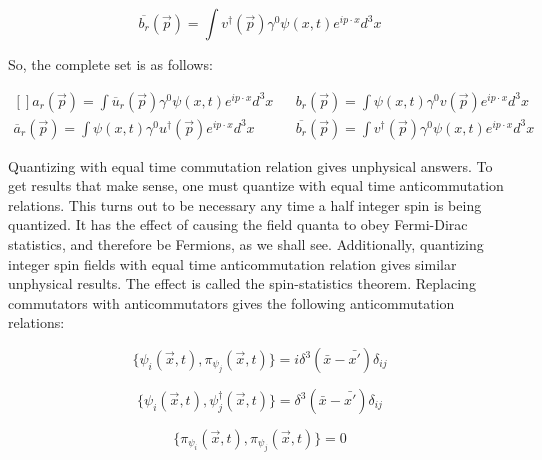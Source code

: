 \documentclass[a4]{article}
\begin{document}
    \begin{framed}
        \begin{equation}
            \overline{b_r} (\vec{p}) = \int v^{\dagger} (\vec{p}) \gamma^0 \psi (x, t) e^{i p \cdot x} d^3 x
        \end{equation}
    \end{framed}

    So, the complete set is as follows:

    \begin{framed}
        \begin{equation}
            \begin{aligned}[]
                a_r (\vec{p}) = \int \overline{u}_{r} (\vec{p}) \gamma^0 \psi (x, t) e^{i p \cdot x} d^3 x & & b_r (\vec{p}) = \int \psi (x, t) \gamma^0 v (\vec{p}) e^{i p \cdot x} d^3 x \\
                \overline{a}_r (\vec{p}) = \int \psi (x, t) \gamma^0 u^{\dagger} (\vec{p}) e^{i p \cdot x} d^3 x & & \overline{b_r} (\vec{p}) = \int v^{\dagger} (\vec{p}) \gamma^0 \psi (x, t) e^{i p \cdot x} d^3 x
            \end{aligned}
        \end{equation}
    \end{framed}

    Quantizing with equal time commutation relation gives unphysical answers. To get results that make sense, one must quantize with equal time anticommutation relations. This turns out to be
    necessary any time a half integer spin is being quantized. It has the effect of causing the field quanta to obey Fermi-Dirac statistics, and therefore be Fermions, as we shall see. 
    Additionally, quantizing integer spin fields with equal time anticommutation relation gives similar unphysical results. The effect is called the spin-statistics theorem. Replacing
    commutators with anticommutators gives the following anticommutation relations:

    \begin{equation}
        \{ \psi_i (\vec{x}, t), \pi_{\psi_j} (\vec{x}, t) \} = i \delta^{3} (\bar{x} - \bar{x'}) \delta_{ij}
    \end{equation}

    \begin{equation}
        \{ \psi_i (\vec{x}, t), \psi_j^{\dagger} (\vec{x}, t) \} = \delta^{3} (\bar{x} - \bar{x'}) \delta_{ij}
    \end{equation}

    \begin{equation}
        \{ \pi_{\psi_i} (\vec{x}, t), \pi_{\psi_j} (\vec{x}, t) \} = 0
    \end{equation}
\end{document}
